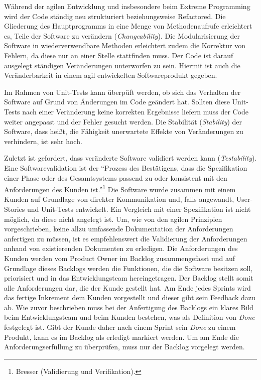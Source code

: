             Während der agilen Entwicklung und insbesondere beim Extreme Programming wird der Code ständig neu strukturiert beziehungsweise Refactored. Die Gliederung des Hauptprogramms in eine Menge von Methodenaufrufe erleichtert es, Teile der Software zu verändern (\emph{Changeability}). Die Modularisierung der Software in wiederverwendbare Methoden erleichtert zudem die Korrektur von Fehlern, da diese nur an einer Stelle stattfinden muss. Der Code ist darauf ausgelegt ständigen Veränderungen unterworfen zu sein. Hiermit ist auch die Veränderbarkeit in einem agil entwickelten Softwareprodukt gegeben.

            Im Rahmen von Unit-Tests kann überpüft werden, ob sich das Verhalten der Software auf Grund von Änderungen im Code geändert hat. Sollten diese Unit-Tests nach einer Veränderung keine korrekten Ergebnisse liefern muss der Code weiter angepasst und der Fehler gesucht werden. Die Stabilität (\emph{Stability}) der Software, dass heißt, die Fähigkeit unerwartete Effekte von Veränderungen zu verhindern, ist sehr hoch.

            Zuletzt ist gefordert, dass veränderte Software validiert werden kann (\emph{Testability}). Eine Softwarevalidation ist der \enquote{Prozess des Bestätigens, dass die Spezifikation einer Phase oder des Gesamtsystems passend zu oder konsistent mit den Anforderungen des Kunden ist.}\footnote{Bresser (Validierung und Verifikation).} Die Software wurde zusammen mit einem Kunden auf Grundlage von direkter Kommunikation und, falls angewandt, User-Stories und Unit-Tests entwickelt. Ein Vergleich mit einer Spezifikation ist nicht möglich, da diese nicht angelegt ist. Um, wie von den agilen Prinzipien vorgeschrieben, keine allzu umfassende Dokumentation der Anforderungen anfertigen zu müssen, ist es empfehlenswert die Validierung der Anforderungen anhand von existierenden Dokumenten zu erledigen. Die Anforderungen des Kunden werden vom Product Owner im Backlog zusammengefasst und auf Grundlage dieses Backlogs werden die Funktionen, die die Software besitzen soll, priorisiert und in das Entwicklungsteam hereingetragen. Der Backlog stellt somit alle Anforderungen dar, die der Kunde gestellt hat. Am Ende jedes Sprints wird das fertige Inkrement dem Kunden vorgestellt und dieser gibt sein Feedback dazu ab. Wie zuvor beschrieben muss bei der Anfertigung des Backlogs ein klares Bild beim Entwicklungsteam und beim Kunden bestehen, was als Definition von \emph{Done} festgelegt ist. Gibt der Kunde daher nach einem Sprint sein \emph{Done} zu einem Produkt, kann es im Backlog als erledigt markiert werden. Um am Ende die Anforderungserfüllung zu überprüfen, muss nur der Backlog vorgelegt werden.

